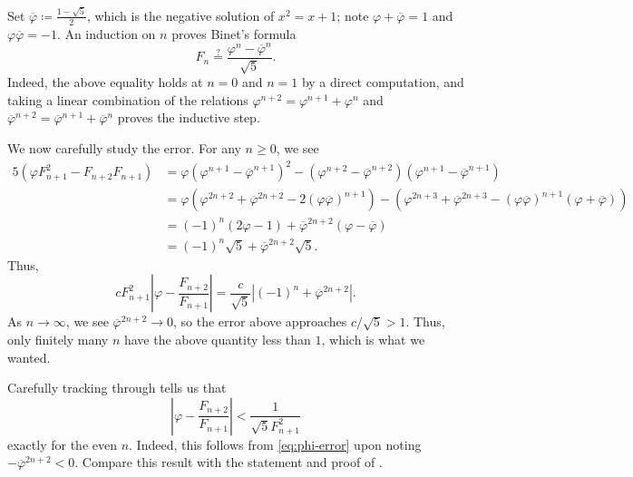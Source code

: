 \documentclass[../notes.tex]{subfiles}
\begin{document}
\begin{solution}
	Set $\overline\varphi\coloneqq\frac{1-\sqrt5}2$, which is the negative solution of $x^2=x+1$; note $\varphi+\overline\varphi=1$ and $\varphi\overline\varphi=-1$. An induction on $n$ proves Binet's formula
	\[F_n\stackrel?=\frac{\varphi^n-\overline\varphi^n}{\sqrt5}.\]
	Indeed, the above equality holds at $n=0$ and $n=1$ by a direct computation, and taking a linear combination of the relations $\varphi^{n+2}=\varphi^{n+1}+\varphi^n$ and $\overline\varphi^{n+2}=\overline\varphi^{n+1}+\overline\varphi^n$ proves the inductive step.

	We now carefully study the error. For any $n\ge0$, we see
	\begin{align*}
		5\left(\varphi F_{n+1}^2-F_{n+2}F_{n+1}\right) &= \varphi\left(\varphi^{n+1}-\overline\varphi^{n+1}\right)^2-\left(\varphi^{n+2}-\overline\varphi^{n+2}\right)\left(\varphi^{n+1}-\overline\varphi^{n+1}\right) \\
		&= \varphi\left(\varphi^{2n+2}+\overline\varphi^{2n+2}-2(\varphi\overline\varphi)^{n+1}\right)-\left(\varphi^{2n+3}+\overline\varphi^{2n+3}-(\varphi\overline\varphi)^{n+1}(\varphi+\overline\varphi)\right) \\
		&= (-1)^n(2\varphi-1)+\overline\varphi^{2n+2}\left(\varphi-\overline\varphi\right) \\
		&= (-1)^n\sqrt5+\overline\varphi^{2n+2}\sqrt5.
	\end{align*}
	Thus,
	\begin{equation}
		cF_{n+1}^2\left|\varphi-\frac{F_{n+2}}{F_{n+1}}\right|=\frac c{\sqrt5}\left|(-1)^n+\overline\varphi^{2n+2}\right|. \label{eq:phi-error}
	\end{equation}
	As $n\to\infty$, we see $\overline\varphi^{2n+2}\to0$, so the error above approaches $c/\sqrt5>1$. Thus, only finitely many $n$ have the above quantity less than $1$, which is what we wanted.
\end{solution}
\begin{remark}
	Carefully tracking through  tells us that
	\[\left|\varphi-\frac{F_{n+2}}{F_{n+1}}\right|<\frac1{\sqrt5F_{n+1}^2}\]
	exactly for the even $n$. Indeed, this follows from \eqref{eq:phi-error} upon noting $-\overline\varphi^{2n+2}<0$. Compare this result with the statement and proof of .
\end{remark}
\end{document}
